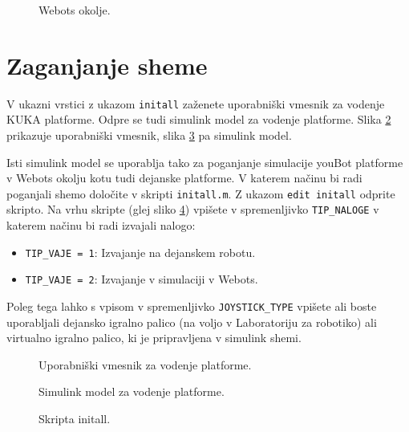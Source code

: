 \begin{figure}[h]
	\centering {}
	\caption{Webots okolje.}
	\label{fig:webots2}
\end{figure}
\section{Zaganjanje sheme}

V ukazni vrstici z ukazom \newline \newline \verb"initall"  \newline \newline zaženete uporabniški vmesnik za vodenje KUKA platforme. Odpre se tudi simulink model za vodenje platforme. Slika \ref{fig:GUI} prikazuje uporabniški vmesnik, slika \ref{fig:model} pa simulink model. 

Isti simulink model se uporablja tako za poganjanje simulacije youBot platforme v Webots okolju kotu tudi dejanske platforme. V katerem načinu bi radi poganjali shemo določite v skripti \verb|initall.m|. Z ukazom \verb|edit initall| odprite skripto. Na vrhu skripte (glej sliko \ref{fig:initall}) vpišete v spremenljivko \verb|TIP_NALOGE| v katerem načinu bi radi izvajali nalogo: 

\begin{itemize}
	\item \verb|TIP_VAJE = 1|: Izvajanje na dejanskem robotu.
	\item \verb|TIP_VAJE = 2|: Izvajanje v simulaciji v Webots.
\end{itemize}

Poleg tega lahko s vpisom v spremenljivko \verb|JOYSTICK_TYPE| vpišete ali boste uporabljali dejansko igralno palico (na voljo v Laboratoriju za robotiko) ali virtualno igralno palico, ki je pripravljena v simulink shemi.

\begin{figure}[h]
	\centering {}
	\caption{Uporabniški vmesnik za vodenje platforme.}
	\label{fig:GUI}
\end{figure}

\begin{figure}[h]
	\centering {}
	\caption{Simulink model za vodenje platforme.}
	\label{fig:model}
\end{figure}

\begin{figure}[h]
	\centering {}
	\caption{Skripta initall.}
	\label{fig:initall}
\end{figure}

